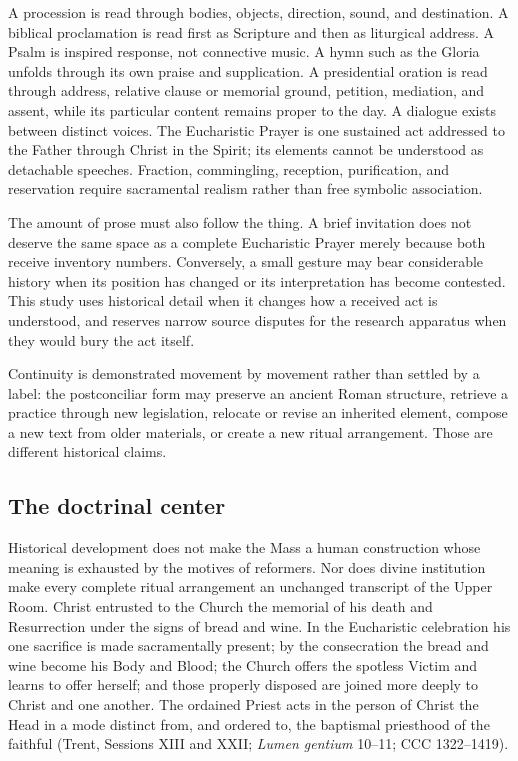 {A procession is read through bodies, objects, direction, sound, and destination. A biblical proclamation is read first as Scripture and then as liturgical address. A Psalm is inspired response, not connective music. A hymn such as the Gloria unfolds through its own praise and supplication. A presidential oration is read through address, relative clause or memorial ground, petition, mediation, and assent, while its particular content remains proper to the day. A dialogue exists between distinct voices. The Eucharistic Prayer is one sustained act addressed to the Father through Christ in the Spirit; its elements cannot be understood as detachable speeches. Fraction, commingling, reception, purification, and reservation require sacramental realism rather than free symbolic association.

The amount of prose must also follow the thing. A brief invitation does not deserve the same space as a complete Eucharistic Prayer merely because both receive inventory numbers. Conversely, a small gesture may bear considerable history when its position has changed or its interpretation has become contested. This study uses historical detail when it changes how a received act is understood, and reserves narrow source disputes for the research apparatus when they would bury the act itself.

Continuity is demonstrated movement by movement rather than settled by a label: the postconciliar form may preserve an ancient Roman structure, retrieve a practice through new legislation, relocate or revise an inherited element, compose a new text from older materials, or create a new ritual arrangement. Those are different historical claims.

\subsection{The doctrinal center}

Historical development does not make the Mass a human construction whose meaning is exhausted by the motives of reformers. Nor does divine institution make every complete ritual arrangement an unchanged transcript of the Upper Room. Christ entrusted to the Church the memorial of his death and Resurrection under the signs of bread and wine. In the Eucharistic celebration his one sacrifice is made sacramentally present; by the consecration the bread and wine become his Body and Blood; the Church offers the spotless Victim and learns to offer herself; and those properly disposed are joined more deeply to Christ and one another. The ordained Priest acts in the person of Christ the Head in a mode distinct from, and ordered to, the baptismal priesthood of the faithful (Trent, Sessions XIII and XXII; \emph{Lumen gentium} 10--11; CCC 1322--1419).

}
